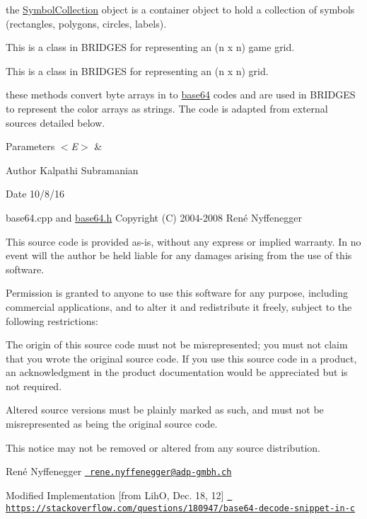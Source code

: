the \mbox{\hyperlink{classbridges_1_1_symbol_collection}{Symbol\+Collection}} object is a container object to hold a collection of symbols (rectangles, polygons, circles, labels).

This is a class in B\+R\+I\+D\+G\+ES for representing an (n x n) game grid.

This is a class in B\+R\+I\+D\+G\+ES for representing an (n x n) grid.

these methods convert byte arrays in to \mbox{\hyperlink{namespacebridges_1_1base64}{base64}} codes and are used in B\+R\+I\+D\+G\+ES to represent the color arrays as strings. The code is adapted from external sources detailed below.


\begin{DoxyParams}{Parameters}
{\em $<$\+E$>$} & \\
\hline
\end{DoxyParams}
\begin{DoxyAuthor}{Author}
Kalpathi Subramanian 
\end{DoxyAuthor}
\begin{DoxyDate}{Date}
10/8/16
\end{DoxyDate}
base64.\+cpp and \mbox{\hyperlink{base64_8h}{base64.\+h}} Copyright (C) 2004-\/2008 René Nyffenegger

This source code is provided \textquotesingle{}as-\/is\textquotesingle{}, without any express or implied warranty. In no event will the author be held liable for any damages arising from the use of this software.

Permission is granted to anyone to use this software for any purpose, including commercial applications, and to alter it and redistribute it freely, subject to the following restrictions\+:


\begin{DoxyEnumerate}
\item The origin of this source code must not be misrepresented; you must not claim that you wrote the original source code. If you use this source code in a product, an acknowledgment in the product documentation would be appreciated but is not required.
\begin{DoxyEnumerate}
\item Altered source versions must be plainly marked as such, and must not be misrepresented as being the original source code.
\item This notice may not be removed or altered from any source distribution.
\end{DoxyEnumerate}

René Nyffenegger \href{mailto:rene.nyffenegger@adp-gmbh.ch}{\texttt{ rene.\+nyffenegger@adp-\/gmbh.\+ch}}

Modified Implementation \mbox{[}from LihO, Dec. 18, 12\mbox{]} \href{https://stackoverflow.com/questions/180947/base64-decode-snippet-in-c}{\texttt{ https\+://stackoverflow.\+com/questions/180947/base64-\/decode-\/snippet-\/in-\/c}}
\end{DoxyEnumerate}


